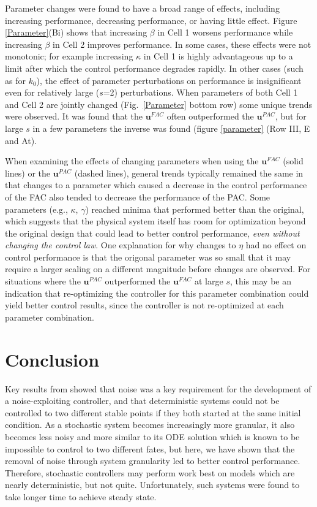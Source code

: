 \documentclass[12pt]{article}
\begin{document}
Parameter changes were found to have a broad range of effects, including increasing performance, decreasing performance, or having little effect. Figure \ref{Parameter}(Bi) shows that increasing $\beta$ in Cell 1 worsens performance while increasing $\beta$ in Cell 2 improves performance. In some cases, these effects were not monotonic; for example increasing $\kappa$ in Cell 1 is highly advantageous up to a limit after which the control performance degrades rapidly. In other cases (such as for $k_0$), the effect of parameter perturbations on performance is insignificant even for relatively large ($s$=2) perturbations. When parameters of both Cell 1 and Cell 2 are jointly changed (Fig.\ \ref{Parameter} bottom row) some unique trends were observed. It was found that the $\mathbf{u}^{FAC}$ often outperformed the $\mathbf{u}^{PAC}$, but for large $s$ in a few parameters the inverse was found (figure \ref{parameter} (Row III, E and At).

When examining the effects of changing parameters when using the $\mathbf{u}^{FAC}$ (solid lines) or the $\mathbf{u}^{PAC}$ (dashed lines), general trends typically remained the same in that changes to a parameter which caused a decrease in the control performance of the FAC also tended to decrease the performance of the PAC. Some parameters (e.g., $\kappa$, $\gamma$) reached minima that performed better than the original, which suggests that the physical system itself has room for optimization beyond the original design that could lead to better control performance, {\em even without changing the control law}.  One explanation for why changes to $\eta$ had no effect on control performance is that the origonal parameter was so small that it may require a larger scaling on a different magnitude before changes are observed. For situations where the $\mathbf{u}^{PAC}$ outperformed the $\mathbf{u}^{FAC}$ at large $s$, this may be an indication that re-optimizing the controller for this parameter combination could yield better control results, since the controller is not re-optimized at each parameter combination.

\section{Conclusion}
Key results from \cite{May2021} showed that noise was a key requirement for the development of a noise-exploiting controller, and that deterministic systems could not be controlled to two different stable points if they both started at the same initial condition. As a stochastic system becomes increasingly more granular, it also becomes less noisy and more similar to its ODE solution which is known to be impossible to control to two different fates, but here, we have shown that the removal of noise through system granularity led to better control performance.  Therefore, stochastic controllers may perform work best on models which are nearly deterministic, but not quite. Unfortunately, such systems were found to take longer time to achieve steady state.
\end{document}
